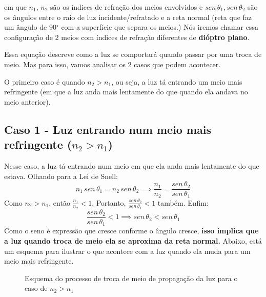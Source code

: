 \documentclass[12pt]{extarticle}
\newcommand{\<}{\langle}
\renewcommand{\>}{\rangle}
\theoremstyle{definition}
\begin{document}
\noindent em que $n_1,\,n_2$ são os índices de refração dos meios envolvidos e $sen\,\theta_1, sen\,\theta_2$ são os ângulos entre o raio de luz incidente/refratado e a reta normal (reta que faz um ângulo de 90$^\circ$ com a superfície que separa os meios.) Nós iremos chamar essa configuração de 2 meios com índices de refração diferentes de \textbf{dióptro plano}.

Essa equação descreve como a luz se comportará quando passar por uma troca de meio. Mas para isso, vamos analisar os 2 casos que podem acontecer. 

O primeiro caso é quando $n_2>n_1$, ou seja, a luz tá entrando um meio mais refringente (em que a luz anda mais lentamente do que quando ela andava no meio anterior).
\subsection{Caso 1 - Luz entrando num meio mais refringente ($n_2 >n_1$)}

Nesse caso, a luz tá entrando num meio em que ela anda mais lentamente do que estava. Olhando para a Lei de Snell:
\begin{equation}
    n_1\,sen\,\theta_1 = n_2\,sen\,\theta_2 \implies \frac{n_1}{n_2} = \frac{sen\,\theta_2}{sen\,\theta_1}
\end{equation}
Como $n_2>n_1$, então $\frac{n_1}{n_2} <1$. Portanto, $\frac{sen\,\theta_2}{sen\,\theta_1} <1$ também. Enfim:
\begin{equation}
    \frac{sen\,\theta_2}{sen\,\theta_1} <1 \implies \boxed{sen\,\theta_2 < sen\,\theta_1}
\end{equation}
Como o seno é expressão que cresce conforme o ângulo cresce, \textbf{isso implica que a luz quando troca de meio ela se aproxima da reta normal.} Abaixo, está um esquema para ilustrar o que acontece com a luz quando ela muda para um meio mais refringente.

\begin{figure}[H]
    \centering
    \caption{Esquema do processo de troca de meio de propagação da luz para o caso de $n_2>n_1$}
    \label{fig:refracao_1}
\end{figure}
\end{document}
